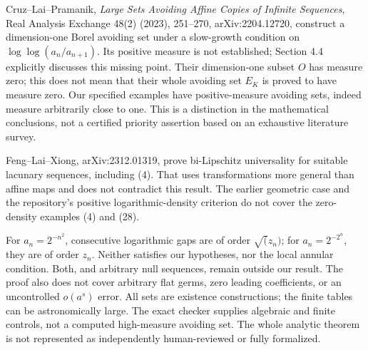 \documentclass[
  11pt,
]{article}
\begin{document}
Cruz--Lai--Pramanik, \emph{Large Sets Avoiding Affine Copies of Infinite
Sequences}, Real Analysis Exchange 48(2) (2023), 251--270,
arXiv:2204.12720, construct a dimension-one Borel avoiding set under a
slow-growth condition on \(\log\log (a_n/a_{n+1})\). Its positive
measure is not established; Section 4.4 explicitly discusses this
missing point. Their dimension-one subset \(O\) has measure zero; this
does not mean that their whole avoiding set \(E_K\) is proved to have
measure zero. Our specified examples have positive-measure avoiding
sets, indeed measure arbitrarily close to one. This is a distinction in
the mathematical conclusions, not a certified priority assertion based
on an exhaustive literature survey.

Feng--Lai--Xiong, arXiv:2312.01319, prove bi-Lipschitz universality for
suitable lacunary sequences, including (4). That uses transformations
more general than affine maps and does not contradict this result. The
earlier geometric case and the repository's positive logarithmic-density
criterion do not cover the zero-density examples (4) and (28).

For \(a_n=2^{-n^2}\), consecutive logarithmic gaps are of order
\(\sqrt(z_n)\); for \(a_n=2^{-2^n}\), they are of order \(z_n\). Neither
satisfies our hypotheses, nor the local annular condition. Both, and
arbitrary null sequences, remain outside our result. The proof also does
not cover arbitrary flat germs, zero leading coefficients, or an
uncontrolled \(o(a^s)\) error. All sets are existence constructions; the
finite tables can be astronomically large. The exact checker supplies
algebraic and finite controls, not a computed high-measure avoiding set.
The whole analytic theorem is not represented as independently
human-reviewed or fully formalized.
\end{document}
